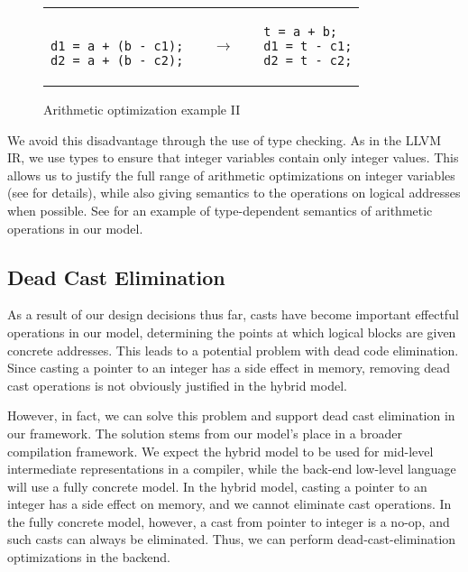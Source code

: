 \begin{figure}[t]
\center
\begin{tabular}{lll}
\begin{minipage}{0.3\textwidth}
\begin{verbatim}

d1 = a + (b - c1);
d2 = a + (b - c2);
\end{verbatim}
\end{minipage}
&
$\quad\rightarrow\quad$
&
\begin{minipage}{0.3\textwidth}
\begin{verbatim}
t = a + b;
d1 = t - c1;
d2 = t - c2;
\end{verbatim}
\end{minipage}
\end{tabular}
\caption{Arithmetic optimization example II}\label{fig:intptrcast:formal-semantics:arith2}
\end{figure}

We avoid this disadvantage through the use of type checking. 
As in the LLVM IR, we use types to ensure that integer variables contain only integer values.
This allows us to justify the full range of arithmetic optimizations on integer variables (see  for details), 
while also giving semantics to the operations on logical addresses when possible.
See  for an example of type-dependent semantics of arithmetic operations in our model.

\subsection{Dead Cast Elimination}
\label{sec:intptrcast:formal-semantics:deadcast}

As a result of our design decisions thus far, casts have become
important effectful operations in our model, determining the points at
which logical blocks are given concrete addresses. This leads to a
potential problem with dead code elimination.  Since casting a pointer
to an integer has a side effect in memory, removing dead cast
operations is not obviously justified in the hybrid model.

However, in fact,
we can solve this problem and support dead cast elimination in our
framework. 
The solution stems from our model's place in a broader compilation
framework. We expect the hybrid model to be used for mid-level
intermediate representations in a compiler, while the back-end
low-level language will use a fully concrete model. In the
hybrid model, casting a pointer to an integer has a side
effect on memory, and we cannot eliminate cast operations. In the
fully concrete model, however, a cast from pointer to integer is a 
no-op, and such casts can always be eliminated. Thus, we can
perform dead-cast-elimination optimizations in the backend.

